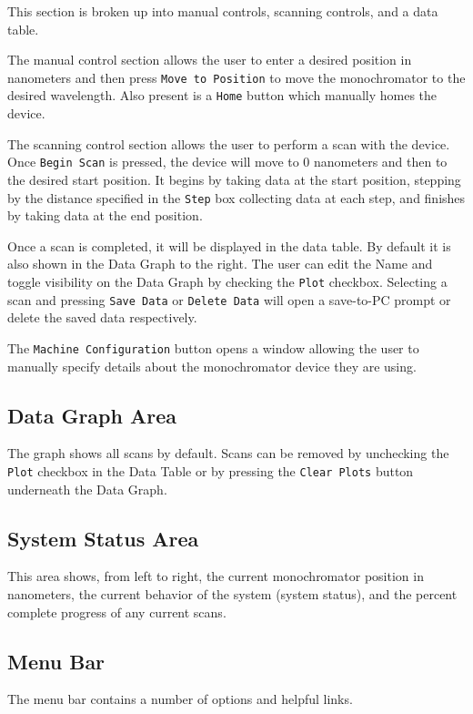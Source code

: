 \documentclass{article}
\begin{document}
This section is broken up into manual controls, scanning controls, and a data table. 

The manual control section allows the user to enter a desired position in nanometers and then press \verb|Move to Position| to move the monochromator to the desired wavelength. Also present is a \verb|Home| button which manually homes the device.

The scanning control section allows the user to perform a scan with the device. Once \verb|Begin Scan| is pressed, the device will move to 0 nanometers and then to the desired start position. It begins by taking data at the start position, stepping by the distance specified in the \verb|Step| box collecting data at each step, and finishes by taking data at the end position.

Once a scan is completed, it will be displayed in the data table. By default it is also shown in the Data Graph to the right. The user can edit the Name and toggle visibility on the Data Graph by checking the \verb|Plot| checkbox. Selecting a scan and pressing \verb|Save Data| or \verb|Delete Data| will open a save-to-PC prompt or delete the saved data respectively.

The \verb|Machine Configuration| button opens a window allowing the user to manually specify details about the monochromator device they are using.

\subsection{Data Graph Area}

The graph shows all scans by default. Scans can be removed by unchecking the \verb|Plot| checkbox in the Data Table or by pressing the \verb|Clear Plots| button underneath the Data Graph.

\subsection{System Status Area}

This area shows, from left to right, the current monochromator position in nanometers, the current behavior of the system (system status), and the percent complete progress of any current scans.

\subsection{Menu Bar}

The menu bar contains a number of options and helpful links.
\end{document}
